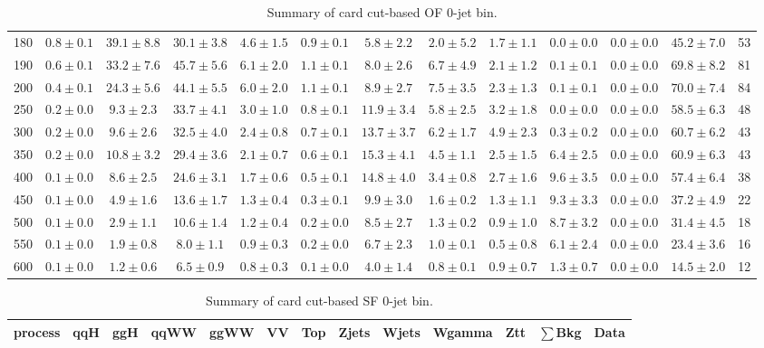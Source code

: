 \begin{table}
{\begin{center}
\begin{tabular}{l | c c | c c c c c c c c  | c c}
180 & $0.8\pm0.1$ & $39.1\pm8.8$ & $30.1\pm3.8$ & $4.6\pm1.5$ & $0.9\pm0.1$ & $5.8\pm2.2$ & $2.0\pm5.2$ & $1.7\pm1.1$ & $0.0\pm0.0$ & $0.0\pm0.0$ & $45.2\pm7.0$ & 53 \\
190 & $0.6\pm0.1$ & $33.2\pm7.6$ & $45.7\pm5.6$ & $6.1\pm2.0$ & $1.1\pm0.1$ & $8.0\pm2.6$ & $6.7\pm4.9$ & $2.1\pm1.2$ & $0.1\pm0.1$ & $0.0\pm0.0$ & $69.8\pm8.2$ & 81 \\
200 & $0.4\pm0.1$ & $24.3\pm5.6$ & $44.1\pm5.5$ & $6.0\pm2.0$ & $1.1\pm0.1$ & $8.9\pm2.7$ & $7.5\pm3.5$ & $2.3\pm1.3$ & $0.1\pm0.1$ & $0.0\pm0.0$ & $70.0\pm7.4$ & 84 \\
250 & $0.2\pm0.0$ & $9.3\pm2.3$ & $33.7\pm4.1$ & $3.0\pm1.0$ & $0.8\pm0.1$ & $11.9\pm3.4$ & $5.8\pm2.5$ & $3.2\pm1.8$ & $0.0\pm0.0$ & $0.0\pm0.0$ & $58.5\pm6.3$ & 48 \\
300 & $0.2\pm0.0$ & $9.6\pm2.6$ & $32.5\pm4.0$ & $2.4\pm0.8$ & $0.7\pm0.1$ & $13.7\pm3.7$ & $6.2\pm1.7$ & $4.9\pm2.3$ & $0.3\pm0.2$ & $0.0\pm0.0$ & $60.7\pm6.2$ & 43 \\
350 & $0.2\pm0.0$ & $10.8\pm3.2$ & $29.4\pm3.6$ & $2.1\pm0.7$ & $0.6\pm0.1$ & $15.3\pm4.1$ & $4.5\pm1.1$ & $2.5\pm1.5$ & $6.4\pm2.5$ & $0.0\pm0.0$ & $60.9\pm6.3$ & 43 \\
400 & $0.1\pm0.0$ & $8.6\pm2.5$ & $24.6\pm3.1$ & $1.7\pm0.6$ & $0.5\pm0.1$ & $14.8\pm4.0$ & $3.4\pm0.8$ & $2.7\pm1.6$ & $9.6\pm3.5$ & $0.0\pm0.0$ & $57.4\pm6.4$ & 38 \\
450 & $0.1\pm0.0$ & $4.9\pm1.6$ & $13.6\pm1.7$ & $1.3\pm0.4$ & $0.3\pm0.1$ & $9.9\pm3.0$ & $1.6\pm0.2$ & $1.3\pm1.1$ & $9.3\pm3.3$ & $0.0\pm0.0$ & $37.2\pm4.9$ & 22 \\
500 & $0.1\pm0.0$ & $2.9\pm1.1$ & $10.6\pm1.4$ & $1.2\pm0.4$ & $0.2\pm0.0$ & $8.5\pm2.7$ & $1.3\pm0.2$ & $0.9\pm1.0$ & $8.7\pm3.2$ & $0.0\pm0.0$ & $31.4\pm4.5$ & 18 \\
550 & $0.1\pm0.0$ & $1.9\pm0.8$ & $8.0\pm1.1$ & $0.9\pm0.3$ & $0.2\pm0.0$ & $6.7\pm2.3$ & $1.0\pm0.1$ & $0.5\pm0.8$ & $6.1\pm2.4$ & $0.0\pm0.0$ & $23.4\pm3.6$ & 16 \\
600 & $0.1\pm0.0$ & $1.2\pm0.6$ & $6.5\pm0.9$ & $0.8\pm0.3$ & $0.1\pm0.0$ & $4.0\pm1.4$ & $0.8\pm0.1$ & $0.9\pm0.7$ & $1.3\pm0.7$ & $0.0\pm0.0$ & $14.5\pm2.0$ & 12 \\
\hline
\end{tabular}
\end{center}
}
\caption{Summary of card cut-based OF 0-jet bin.}
\end{table}
\begin{table}
{%
 \tiny
 \begin{center}
 \begin{tabular}{l | c c | c c c c c c c c  | c c}
 \hline
 process & qqH & ggH & qqWW & ggWW & VV & Top & Zjets & Wjets & Wgamma & Ztt & $\sum$Bkg & Data \\
 \hline

\hline
\end{tabular}
\end{center}
}
\caption{Summary of card cut-based SF 0-jet bin.}
\end{table}
